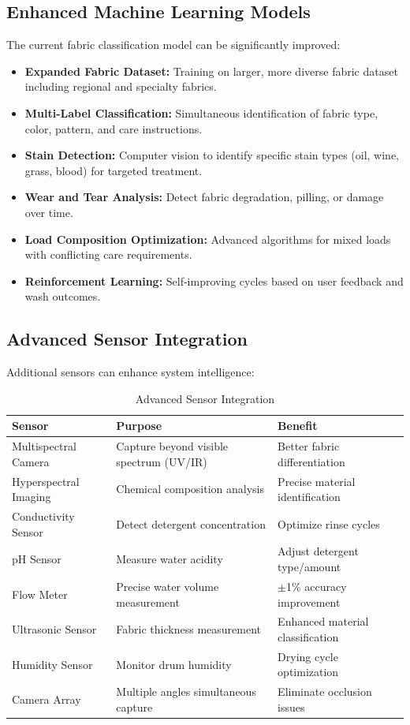 \subsection{Enhanced Machine Learning Models}
The current fabric classification model can be significantly improved:
\begin{itemize}
    \item \textbf{Expanded Fabric Dataset:} Training on larger, more diverse fabric dataset including regional and specialty fabrics.
    \item \textbf{Multi-Label Classification:} Simultaneous identification of fabric type, color, pattern, and care instructions.
    \item \textbf{Stain Detection:} Computer vision to identify specific stain types (oil, wine, grass, blood) for targeted treatment.
    \item \textbf{Wear and Tear Analysis:} Detect fabric degradation, pilling, or damage over time.
    \item \textbf{Load Composition Optimization:} Advanced algorithms for mixed loads with conflicting care requirements.
    \item \textbf{Reinforcement Learning:} Self-improving cycles based on user feedback and wash outcomes.
\end{itemize}

\subsection{Advanced Sensor Integration}
Additional sensors can enhance system intelligence:

\begin{table}[H]
    \centering
    \small
    \begin{tabular}{|l|l|l|}
        \hline
        \textbf{Sensor} & \textbf{Purpose} & \textbf{Benefit} \\
        \hline
        Multispectral Camera & Capture beyond visible spectrum (UV/IR) & Better fabric differentiation \\
        \hline
        Hyperspectral Imaging & Chemical composition analysis & Precise material identification \\
        \hline
        Conductivity Sensor & Detect detergent concentration & Optimize rinse cycles \\
        \hline
        pH Sensor & Measure water acidity & Adjust detergent type/amount \\
        \hline
        Flow Meter & Precise water volume measurement & $\pm$1\% accuracy improvement \\
        \hline
        Ultrasonic Sensor & Fabric thickness measurement & Enhanced material classification \\
        \hline
        Humidity Sensor & Monitor drum humidity & Drying cycle optimization \\
        \hline
        Camera Array & Multiple angles simultaneous capture & Eliminate occlusion issues \\
        \hline
    \end{tabular}
    \caption{Advanced Sensor Integration}
    \label{tab:advanced-sensors}
\end{table}

